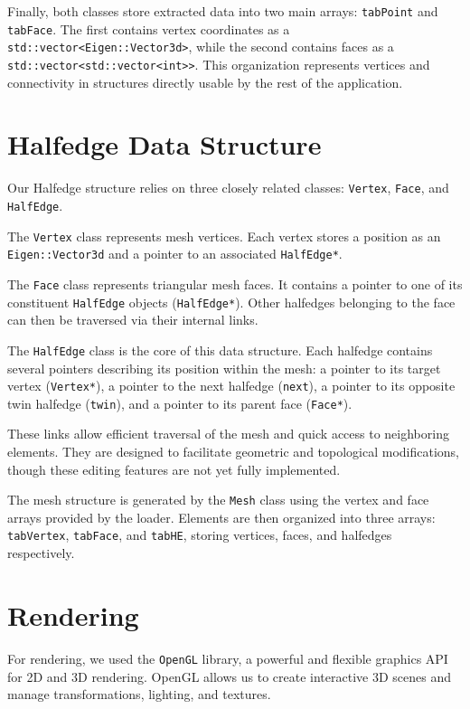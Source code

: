 \documentclass[12pt,a4paper]{article}
\begin{document}
Finally, both classes store extracted data into two main arrays: \texttt{tabPoint} and \texttt{tabFace}. The first contains vertex coordinates as a \texttt{std::vector<Eigen::Vector3d>}, while the second contains faces as a \texttt{std::vector<std::vector<int>>}. This organization represents vertices and connectivity in structures directly usable by the rest of the application.

\newpage
\section{Halfedge Data Structure}

Our Halfedge structure relies on three closely related classes: \texttt{Vertex}, \texttt{Face}, and \texttt{HalfEdge}.

The \texttt{Vertex} class represents mesh vertices. Each vertex stores a position as an \texttt{Eigen::Vector3d} and a pointer to an associated \texttt{HalfEdge*}.

The \texttt{Face} class represents triangular mesh faces. It contains a pointer to one of its constituent \texttt{HalfEdge} objects (\texttt{HalfEdge*}). Other halfedges belonging to the face can then be traversed via their internal links.

The \texttt{HalfEdge} class is the core of this data structure. Each halfedge contains several pointers describing its position within the mesh: a pointer to its target vertex (\texttt{Vertex*}), a pointer to the next halfedge (\texttt{next}), a pointer to its opposite twin halfedge (\texttt{twin}), and a pointer to its parent face (\texttt{Face*}).

These links allow efficient traversal of the mesh and quick access to neighboring elements. They are designed to facilitate geometric and topological modifications, though these editing features are not yet fully implemented.

The mesh structure is generated by the \texttt{Mesh} class using the vertex and face arrays provided by the loader. Elements are then organized into three arrays: \texttt{tabVertex}, \texttt{tabFace}, and \texttt{tabHE}, storing vertices, faces, and halfedges respectively.

\newpage

\section{Rendering}

For rendering, we used the \texttt{OpenGL} library, a powerful and flexible graphics API for 2D and 3D rendering. OpenGL allows us to create interactive 3D scenes and manage transformations, lighting, and textures.
\end{document}
